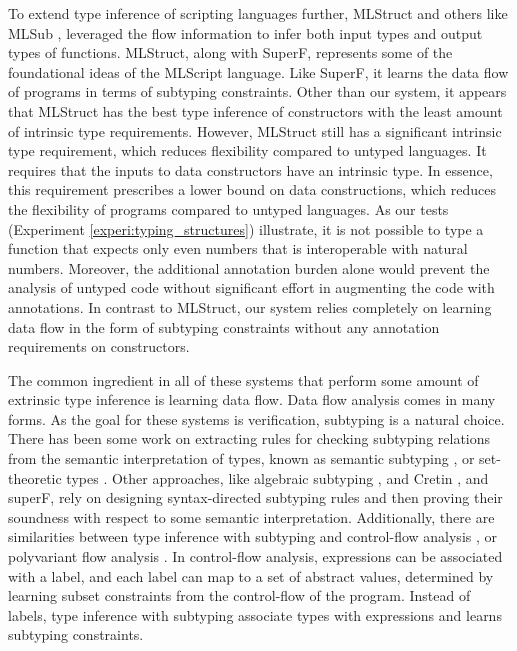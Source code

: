 \documentclass[table,dvipsnames,acmsmall]{acmart}
\theoremstyle{definition}
\begin{document}
To extend type inference of scripting languages further, MLStruct \cite{} and others like MLSub \cite{}, 
leveraged the flow information to infer both input types and output types of functions.
MLStruct, along with SuperF, represents some of the foundational ideas of the MLScript language.
Like SuperF, it learns the data flow of programs in terms of subtyping constraints.
Other than our system, it appears that MLStruct has the best type inference of constructors
with the least amount of intrinsic type requirements. 
However, MLStruct still has a significant intrinsic type requirement, which reduces flexibility compared
to untyped languages. It requires that the inputs to data constructors have an intrinsic type.  
In essence, this requirement prescribes a lower bound on data constructions,
which reduces the flexibility of programs compared to untyped languages. 
As our tests (Experiment \ref{experi:typing_structures})
illustrate, it is not possible to type a function that expects only even numbers that is interoperable with natural numbers.
Moreover, the additional annotation burden alone would prevent the analysis of untyped code without
significant effort in augmenting the code with annotations.
In contrast to MLStruct, our system relies completely on learning data flow in the form of subtyping constraints
without any annotation requirements on constructors. 


The common ingredient in all of these systems that perform some amount of extrinsic type inference is
learning data flow. Data flow analysis comes in many forms. As the goal for these systems is verification,
subtyping is a natural choice. There has been some work on extracting rules for checking subtyping relations
from the semantic interpretation of types, known as semantic subtyping \cite{}, or set-theoretic types \cite{}.
Other approaches, like algebraic subtyping \cite{}, and Cretin \cite{}, and superF, 
rely on designing syntax-directed subtyping rules and then proving their soundness with respect to some semantic interpretation. 
Additionally, there are similarities between type inference with subtyping and control-flow analysis \cite{}, or polyvariant flow analysis \cite{}.
In control-flow analysis, expressions can be associated with a label, and each label can map to a set of abstract values,
determined by learning subset constraints from the control-flow of the program. 
Instead of labels, type inference with subtyping associate types  
with expressions and learns subtyping constraints.
\end{document}
